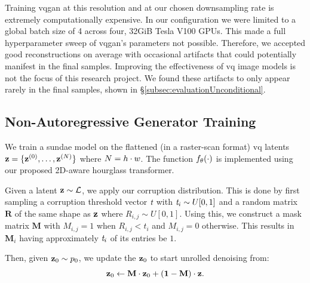 Training \gls{vqgan} at this resolution and at our chosen downsampling rate is
extremely computationally expensive. In our configuration we were limited to a
global batch size of 4 across four, 32GiB Tesla V100 GPUs. This made a full
hyperparameter sweep of \gls{vqgan}'s parameters not possible. Therefore, we
accepted good reconstructions on average with occasional artifacts that could
potentially manifest in the final samples. Improving the effectiveness of \gls{vq}
image models is not the focus of this research project. We
found these artifacts to only appear rarely in the final samples, shown in
\S\ref{subsec:evaluationUnconditional}.

\subsection{Non-Autoregressive Generator Training}
\label{subsec:sundaeTraining}

We train a \gls{sundae} model on the flattened (in a raster-scan format)
\gls{vq} latents $\mathbf{z} = \{\mathbf{z}^{(0)}, \dots, \mathbf{z}^{(N)}\}$
where $N = h \cdot w$. The function $f_\theta(\cdot)$ is
implemented using our proposed 2D-aware hourglass transformer. 

Given a latent $\mathbf{z} \sim \mathcal{L}$, we apply our corruption
distribution. This is done by first sampling a corruption threshold vector
$\textit{t}$ with $\textit{t}_i \sim U[0, 1]$ and a random
matrix $\mathbf{R}$ of the same shape as $\mathbf{z}$ where $R_{i,j} \sim U[0,1]$.
Using this, we construct a mask matrix $\mathbf{M}$ with $M_{i,j} = 1$ when
$R_{i,j} < t_i$ and $M_{i,j} = 0$ otherwise. This results in $\mathbf{M}_i$ having
approximately $\textit{t}_i$ of its entries be $1$.

Then, given $\mathbf{z}_0 \sim p_0$, we update the $\mathbf{z}_0$ to start unrolled
denoising from:
\begin{equation}
    \mathbf{z}_0 \leftarrow \mathbf{M} \cdot \mathbf{z}_0 + (\mathbf{1} - \mathbf{M})
    \cdot \mathbf{z} \text{.}
\end{equation}

